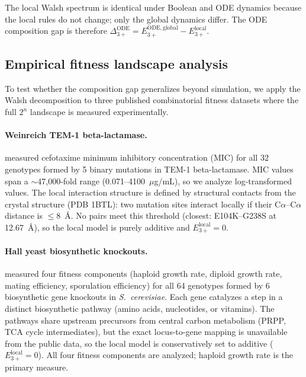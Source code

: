 \documentclass[10pt]{article}
\begin{document}
The local Walsh spectrum is identical under Boolean and ODE dynamics
because the local rules do not change; only the global dynamics
differ. The ODE composition gap is therefore
$\Delta_{3+}^{\mathrm{ODE}} = E_{3+}^{\mathrm{ODE,global}} - E_{3+}^{\mathrm{local}}$.


\subsection{Empirical fitness landscape analysis}
\label{sec:empirical-method}

To test whether the composition gap generalizes beyond simulation,
we apply the Walsh decomposition to three published combinatorial
fitness datasets where the full $2^n$ landscape is measured
experimentally.

\paragraph{Weinreich TEM-1 beta-lactamase.}
\citet{weinreich2006darwinian} measured cefotaxime minimum
inhibitory concentration (MIC) for all 32 genotypes formed by 5
binary mutations in TEM-1 beta-lactamase. MIC values span a
$\sim$47{,}000-fold range (0.071--4100~$\mu$g/mL), so we analyze
log-transformed values. The local interaction structure is defined
by structural contacts from the crystal structure (PDB 1BTL): two
mutation sites interact locally if their C$\alpha$--C$\alpha$
distance is $\leq 8$~\AA. No pairs meet this threshold (closest:
E104K--G238S at 12.67~\AA), so the local model is purely additive
and $E_{3+}^{\mathrm{local}} = 0$.

\paragraph{Hall yeast biosynthetic knockouts.}
\citet{hall2010fitness} measured four fitness components (haploid
growth rate, diploid growth rate, mating efficiency, sporulation
efficiency) for all 64 genotypes formed by 6 biosynthetic gene
knockouts in \emph{S.~cerevisiae}. Each gene catalyzes a step in a
distinct biosynthetic pathway (amino acids, nucleotides, or
vitamins). The pathways share upstream precursors from central
carbon metabolism (PRPP, TCA cycle intermediates), but the exact
locus-to-gene mapping is unavailable from the public data, so the
local model is conservatively set to additive
($E_{3+}^{\mathrm{local}} = 0$). All four fitness components are
analyzed; haploid growth rate is the primary measure.
\end{document}
